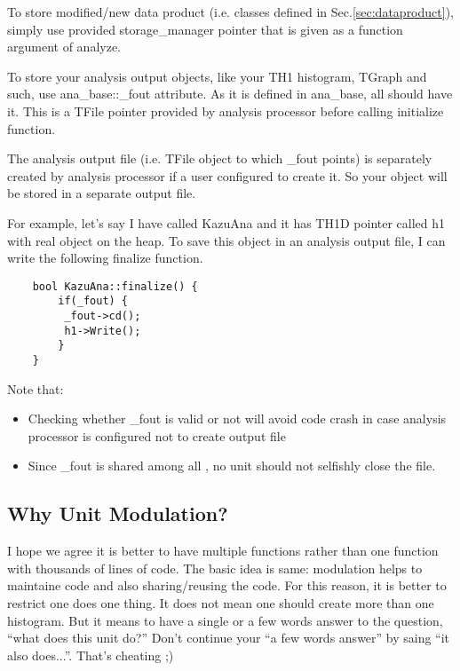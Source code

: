 To store modified/new data product (i.e. classes defined in Sec.\ref{sec:dataproduct}), simply use provided {\ttfamily storage\_manager} pointer that is given as a function argument of {\ttfamily analyze}. 

To store your analysis output \ROOT objects, like your {\ttfamily TH1} histogram, {\ttfamily TGraph} and such, use {\ttfamily ana\_base::\_fout} attribute. As it is defined in {\ttfamily ana\_base}, all \anaunit should have it. This is a {\ttfamily TFile} pointer provided by analysis processor before calling {\ttfamily initialize} function. 

The analysis output file (i.e. {\ttfamily TFile} object to which {\ttfamily \_fout} points) is separately created by analysis processor if a user configured to create it. So your object will be stored in a separate output \ROOT file.

For example, let's say I have \anaunit called {\ttfamily KazuAna} and it has {\ttfamily TH1D} pointer called {\ttfamily h1} with real object on the heap. To save this object in an analysis output file, I can write the following {\ttfamily finalize} function.
\begin{lstlisting}
    bool KazuAna::finalize() {
        if(_fout) {
         _fout->cd();
         h1->Write();
        }
    }
\end{lstlisting}
Note that:
\begin{itemize}
\item Checking whether {\ttfamily \_fout} is valid or not will avoid code crash in case analysis processor is configured not to create output file
\item Since {\ttfamily \_fout} is shared among all \anaunit, no unit should not selfishly close the file.
\end{itemize}


\subsection{Why Unit Modulation?}
I hope we agree it is better to have multiple functions rather than one function with thousands of lines of code. 
The basic idea is same: modulation helps to maintaine code and also sharing/reusing the code.
For this reason, it is better to restrict one \anaunit does one thing.
It does not mean one \anaunit should create more than one histogram. 
But it means to have a single or a few words answer to the question, ``what does this unit do?''
Don't continue your ``a few words answer'' by saing ``it also does...''. That's cheating ;)

